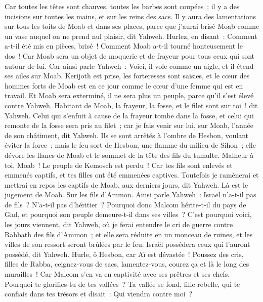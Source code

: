 \begin{multicols}{2}
Car toutes les têtes sont chauves, toutes les barbes sont coupées~; il y a des incisions sur toutes les mains, et sur les reins des sacs.
Il y aura des lamentations sur tous les toits de Moab et dans ses places, parce que j'aurai brisé Moab comme un vase auquel on ne prend nul plaisir, dit Yahweh.
Hurlez, en disant~: Comment a-t-il été mis en pièces, brisé~! Comment Moab a-t-il tourné honteusement le dos~! Car Moab sera un objet de moquerie et de frayeur pour tous ceux qui sont autour de lui.
Car ainsi parle Yahweh~: Voici, il vole comme un aigle, et il étend ses ailes sur Moab.
Kerijoth est prise, les forteresses sont saisies, et le cœur des hommes forts de Moab est en ce jour comme le cœur d'une femme qui est en travail.
Et Moab sera exterminé, il ne sera plus un peuple, parce qu'il s'est élevé contre Yahweh.
Habitant de Moab, la frayeur, la fosse, et le filet sont sur toi~! dit Yahweh.
Celui qui s'enfuit à cause de la frayeur tombe dans la fosse, et celui qui remonte de la fosse sera pris au filet~; car je fais venir sur lui, sur Moab, l'année de son châtiment, dit Yahweh.
Ils se sont arrêtés à l'ombre de Hesbon, voulant éviter la force~; mais le feu sort de Hesbon, une flamme du milieu de Sihon~; elle dévore les flancs de Moab et le sommet de la tête des fils du tumulte.
Malheur à toi, Moab~! Le peuple de Kemosch est perdu~! Car tes fils sont enlevés et emmenés captifs, et tes filles ont été emmenées captives.
Toutefois je ramènerai et mettrai en repos les captifs de Moab, aux derniers jours, dit Yahweh. Là est le jugement de Moab.
\VerseOne{}Sur les fils d'Ammon. Ainsi parle Yahweh~: Israël n'a-t-il pas de fils~? N'a-t-il pas d'héritier~? Pourquoi donc Malcom hérite-t-il du pays de Gad, et pourquoi son peuple demeure-t-il dans ses villes~?
C'est pourquoi voici, les jours viennent, dit Yahweh, où je ferai entendre le cri de guerre contre Rabbath des fils d'Ammon~; et elle sera réduite en un monceau de ruines, et les villes de son ressort seront brûlées par le feu. Israël possédera ceux qui l'auront possédé, dit Yahweh.
Hurle, ô Hesbon, car Aï est dévastée~! Poussez des cris, filles de Rabba, ceignez-vous de sacs, lamentez-vous, courez ça et là le long des murailles~! Car Malcom s'en va en captivité avec ses prêtres et ses chefs.
Pourquoi te glorifies-tu de tes vallées~? Ta vallée se fond, fille rebelle, qui te confiais dans tes trésors et disait~: Qui viendra contre moi~?

\end{multicols}
